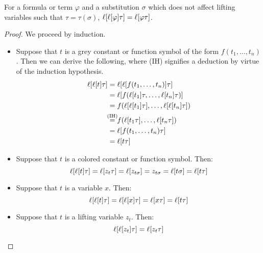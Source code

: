 %
%
\begin{lemma}
	\label{lemma:lifting_tau_commute}
	For a formula or term $\varphi$ and a substitution $\sigma$ which does not affect lifting variables such that $\tau = \tau(\sigma)$,
	$\lifboth{\lifboth{ \varphi} \tau} =\nolinebreak \lifboth{ \varphi \tau } $.
\end{lemma}
\begin{proof}
	We proceed by induction.

	\begin{itemize}
		\item Suppose that $t$ is a grey constant or function symbol of the form $f(t_1, \dots, t_n)$.
			Then we can derive the following, where (IH) signifies a deduction by virtue of the induction hypothesis. 
			\begin{align*}
				\lifboth{\lifboth{t}\tau} &= \lifboth{\lifboth{ f(t_1, \dots, t_n)}\tau} \\
																										 &= \lifboth{ f(\lifboth{t_1}\tau, \dots, \lifboth{t_n}\tau) } \\
																							 &= f(\lifboth{\lifboth{t_1}\tau}, \dots, \lifboth{\lifboth{t_n}\tau}) \\
																					&\stackrel{\mathclap{\text{(IH)}}}= f(\lifboth{t_1\tau}, \dots, \lifboth{t_n\tau}) \\
																			&= \lifboth{f(t_1, \dots, t_n)\tau} \\
																		&= \lifboth{t\tau}
			\end{align*}
		\item Suppose that $t$ is a colored constant or function symbol. Then:
			\[
				\ell[\ell[t]\tau]= \ell[z_t\tau] 
				= \ell[z_{t\sigma}] 
				= z_{t\sigma} 
				= \ell[t\sigma] 
				= \ell[t\tau]
			\]
		\item Suppose that $t$ is a variable $x$. Then:
			\[
				\ell[\ell[t]\tau] = \ell[\ell[ x]\tau] = \ell[x\tau] = \ell[t\tau]
			\]
		\item Suppose that $t$ is a lifting variable $z_t$. Then:
			\[
				\ell[\ell[z_t]\tau] = \ell[z_t\tau] 
				\qedhere
			\]
	\end{itemize}

\end{proof}

